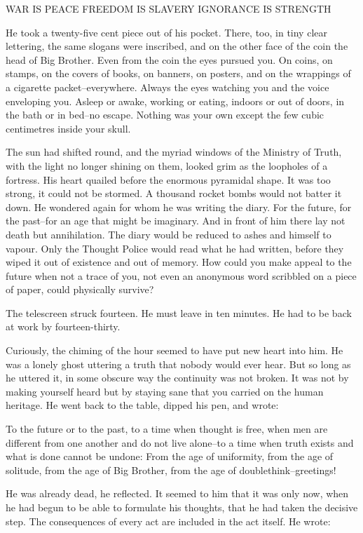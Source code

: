 \documentclass{article}
\begin{document}
  WAR IS PEACE
  FREEDOM IS SLAVERY
  IGNORANCE IS STRENGTH


He took a twenty-five cent piece out of his pocket. There, too, in tiny
clear lettering, the same slogans were inscribed, and on the other face of
the coin the head of Big Brother. Even from the coin the eyes pursued you.
On coins, on stamps, on the covers of books, on banners, on posters, and on
the wrappings of a cigarette packet--everywhere. Always the eyes watching
you and the voice enveloping you. Asleep or awake, working or eating,
indoors or out of doors, in the bath or in bed--no escape. Nothing was your
own except the few cubic centimetres inside your skull.

The sun had shifted round, and the myriad windows of the Ministry of Truth,
with the light no longer shining on them, looked grim as the loopholes of a
fortress. His heart quailed before the enormous pyramidal shape. It was too
strong, it could not be stormed. A thousand rocket bombs would not batter
it down. He wondered again for whom he was writing the diary. For the
future, for the past--for an age that might be imaginary. And in front of
him there lay not death but annihilation. The diary would be reduced to
ashes and himself to vapour. Only the Thought Police would read what he had
written, before they wiped it out of existence and out of memory. How could
you make appeal to the future when not a trace of you, not even an
anonymous word scribbled on a piece of paper, could physically survive?

The telescreen struck fourteen. He must leave in ten minutes. He had to be
back at work by fourteen-thirty.

Curiously, the chiming of the hour seemed to have put new heart into him.
He was a lonely ghost uttering a truth that nobody would ever hear. But so
long as he uttered it, in some obscure way the continuity was not broken.
It was not by making yourself heard but by staying sane that you carried on
the human heritage. He went back to the table, dipped his pen, and wrote:


   To the future or to the past, to a time when thought is free, when men
are different from one another and do not live alone--to a time when truth
exists and what is done cannot be undone:
   From the age of uniformity, from the age of solitude, from the age of
Big Brother, from the age of doublethink--greetings!


He was already dead, he reflected. It seemed to him that it was only now,
when he had begun to be able to formulate his thoughts, that he had taken
the decisive step. The consequences of every act are included in the act
itself. He wrote:
\end{document}
